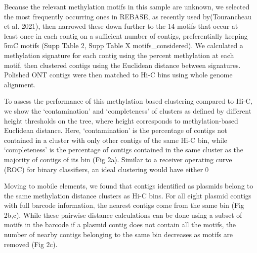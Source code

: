 Because the relevant methylation motifs in this sample are unknown, we selected the most frequently occurring ones in REBASE, as recently used by(Tourancheau et al. 2021), then narrowed these down further to the 14 motifs that occur at least once in each contig on a sufficient number of contigs, preferentially keeping 5mC motifs  (Supp Table 2, Supp Table X motifs_considered). We calculated a methylation signature for each contig using the percent methylation at each motif, then clustered contigs using the Euclidean distance between signatures. Polished ONT contigs were then matched to Hi-C bins using whole genome alignment.

To assess the performance of this methylation based clustering compared to Hi-C, we show the ‘contamination’ and ‘completeness’ of clusters as defined by different height thresholds on the tree, where height corresponds to methylation-based Euclidean distance. Here, ‘contamination’ is the percentage of contigs not contained in a cluster with only other contigs of the same Hi-C bin, while ‘completeness’ is the percentage of contigs contained in the same cluster as the majority of contigs of its bin (Fig 2a). Similar to a receiver operating curve (ROC) for binary classifiers, an ideal clustering would have either 0%

Moving to mobile elements, we found that contigs identified as plasmids belong to the same methylation distance clusters as Hi-C bins.  For all eight plasmid contigs with full barcode information,  the nearest contigs come from the same bin (Fig 2b,c). While these pairwise distance calculations can be done using a subset of motifs in the barcode if a plasmid contig does not contain all the motifs, the number of nearby contigs belonging to the same bin decreases as motifs are removed (Fig 2c).

